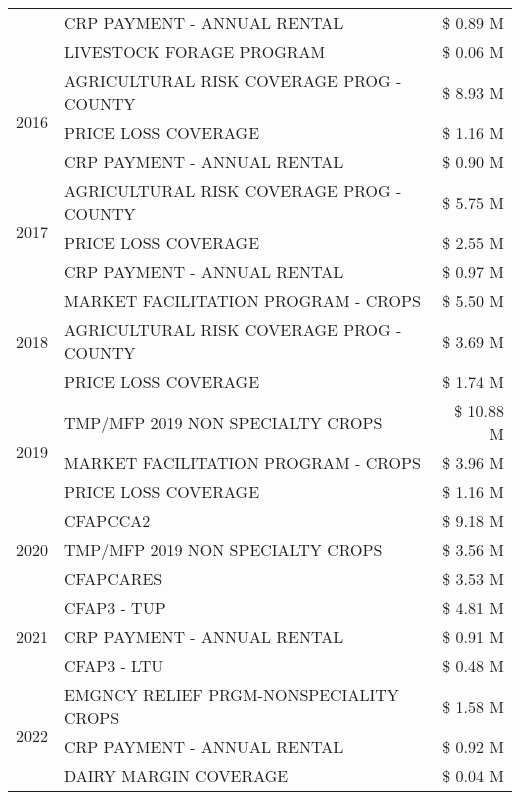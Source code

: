 \begin{tabular}{llr}
 & CRP PAYMENT - ANNUAL RENTAL & \$ 0.89 M \\
 & LIVESTOCK FORAGE PROGRAM & \$ 0.06 M \\
\cline{1-3}
\multirow[t]{3}{*}{2016} & AGRICULTURAL RISK COVERAGE PROG - COUNTY & \$ 8.93 M \\
 & PRICE LOSS COVERAGE & \$ 1.16 M \\
 & CRP PAYMENT - ANNUAL RENTAL & \$ 0.90 M \\
\cline{1-3}
\multirow[t]{3}{*}{2017} & AGRICULTURAL RISK COVERAGE PROG - COUNTY & \$ 5.75 M \\
 & PRICE LOSS COVERAGE & \$ 2.55 M \\
 & CRP PAYMENT - ANNUAL RENTAL & \$ 0.97 M \\
\cline{1-3}
\multirow[t]{3}{*}{2018} & MARKET FACILITATION PROGRAM - CROPS & \$ 5.50 M \\
 & AGRICULTURAL RISK COVERAGE PROG - COUNTY & \$ 3.69 M \\
 & PRICE LOSS COVERAGE & \$ 1.74 M \\
\cline{1-3}
\multirow[t]{3}{*}{2019} & TMP/MFP 2019 NON SPECIALTY CROPS & \$ 10.88 M \\
 & MARKET FACILITATION PROGRAM - CROPS & \$ 3.96 M \\
 & PRICE LOSS COVERAGE & \$ 1.16 M \\
\cline{1-3}
\multirow[t]{3}{*}{2020} & CFAPCCA2 & \$ 9.18 M \\
 & TMP/MFP 2019 NON SPECIALTY CROPS & \$ 3.56 M \\
 & CFAPCARES & \$ 3.53 M \\
\cline{1-3}
\multirow[t]{3}{*}{2021} & CFAP3 - TUP & \$ 4.81 M \\
 & CRP PAYMENT - ANNUAL RENTAL & \$ 0.91 M \\
 & CFAP3 - LTU & \$ 0.48 M \\
\cline{1-3}
\multirow[t]{3}{*}{2022} & EMGNCY RELIEF PRGM-NONSPECIALITY CROPS & \$ 1.58 M \\
 & CRP PAYMENT - ANNUAL RENTAL & \$ 0.92 M \\
 & DAIRY MARGIN COVERAGE & \$ 0.04 M \\
\cline{1-3}
\bottomrule
\end{tabular}
